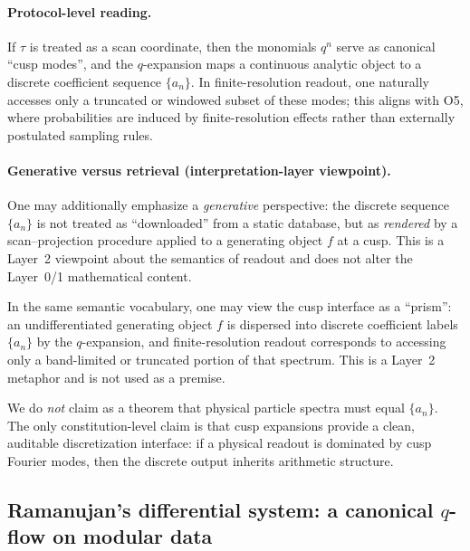 \paragraph{Protocol-level reading.}
If $\tau$ is treated as a scan coordinate, then the monomials $q^n$ serve as canonical ``cusp modes'', and the $q$-expansion maps a continuous analytic object to a discrete coefficient sequence $\{a_n\}$. In finite-resolution readout, one naturally accesses only a truncated or windowed subset of these modes; this aligns with O5, where probabilities are induced by finite-resolution effects rather than externally postulated sampling rules.

\paragraph{Generative versus retrieval (interpretation-layer viewpoint).}
One may additionally emphasize a \emph{generative} perspective: the discrete sequence $\{a_n\}$ is not treated as ``downloaded'' from a static database, but as \emph{rendered} by a scan--projection procedure applied to a generating object $f$ at a cusp. This is a Layer~2 viewpoint about the semantics of readout and does not alter the Layer~0/1 mathematical content.

\begin{remark}
In the same semantic vocabulary, one may view the cusp interface as a ``prism'': an undifferentiated generating object $f$ is dispersed into discrete coefficient labels $\{a_n\}$ by the $q$-expansion, and finite-resolution readout corresponds to accessing only a band-limited or truncated portion of that spectrum. This is a Layer~2 metaphor and is not used as a premise.
\end{remark}

\begin{remark}
We do \emph{not} claim as a theorem that physical particle spectra must equal $\{a_n\}$. The only constitution-level claim is that cusp expansions provide a clean, auditable discretization interface: if a physical readout is dominated by cusp Fourier modes, then the discrete output inherits arithmetic structure.
\end{remark}

\subsection{Ramanujan's differential system: a canonical \texorpdfstring{$q$}{q}-flow on modular data}
\label{sec:ramanujan_differential_system}

